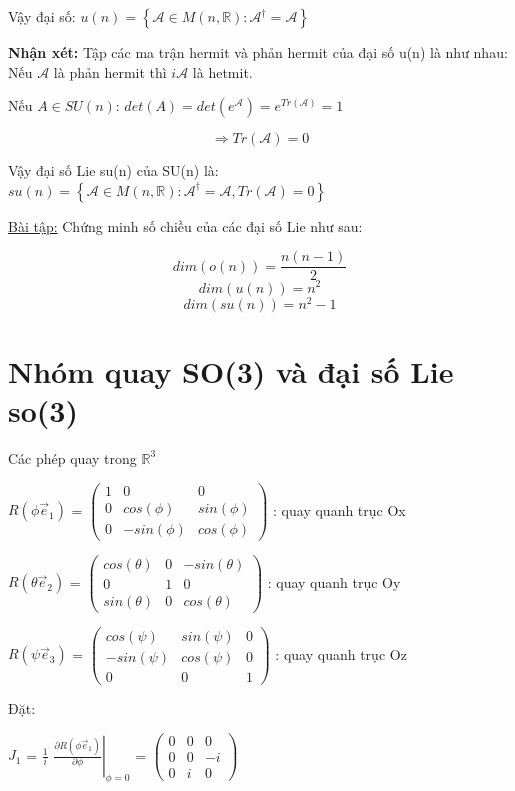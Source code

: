 \documentclass{report}
\begin{document}
Vậy đại số: \( u(n) = \left\lbrace { \mathcal{A} \in M(n,\mathbb{R}): \mathcal{A}^{\dagger} = \mathcal{A} } \right\rbrace \)

\textbf{Nhận xét:} Tập các ma trận hermit và phản hermit của đại số u(n) là như nhau: Nếu \( \mathcal{A} \) là phản hermit thì \( i \mathcal{A} \) là hetmit.

Nếu \( A \in SU(n) \): \( det(A) = det(e^{\mathcal{A}}) = e^{Tr(\mathcal{A})} = 1 \)

\[ \Rightarrow Tr(\mathcal{A}) = 0 \]

Vậy đại số Lie su(n) của SU(n) là:  \( su(n) = \left\lbrace { \mathcal{A} \in M(n,\mathbb{R}): \mathcal{A}^{\dagger} = \mathcal{A} }, Tr(\mathcal{A}) = 0 \right\rbrace \)

\underline{Bài tập:} Chứng minh số chiều của các đại số Lie như sau:

\[ dim (o(n)) = \frac{n(n-1)}{2} \]
\[ dim (u(n)) = n^{2} \]
\[ dim (su(n)) = n^{2} -1 \] 

\section{Nhóm quay SO(3) và đại số Lie so(3)}

Các phép quay trong \( \mathbb{R}^{3} \)

	\(R(\phi \vec{e}_{1}) \) = \( \begin{pmatrix}
	1 & 0 & 0 \\
	0 & cos(\phi) & sin(\phi) \\
	0 & -sin(\phi) & cos(\phi)
	\end{pmatrix} \) : quay quanh trục Ox
	
	\(R(\theta \vec{e}_{2}) \) = \( \begin{pmatrix}
	cos(\theta) & 0 & -sin(\theta) \\
	0 & 1 & 0 \\
	sin(\theta) & 0 & cos(\theta)
	\end{pmatrix} \) : quay quanh trục Oy
	
	\(R(\psi \vec{e}_{3}) \) = \( \begin{pmatrix}
	cos(\psi) & sin(\psi) & 0 \\
	-sin(\psi) & cos(\psi) & 0 \\
	0 & 0 & 1
	\end{pmatrix} \) : quay quanh trục Oz

Đặt: 

\(J_{1}\) = \( \frac{1}{i} \) \( \left. { \frac{ \partial R(\phi \vec{e}_{1}) }{\partial \phi} } \right|_{\phi = 0} \) = \( \begin{pmatrix}
	0 & 0 & 0 \\
	0 & 0 & -i \\
	0 & i & 0
	\end{pmatrix} \)
	
\end{document}
